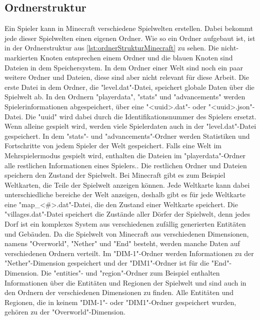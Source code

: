 \subsection{Ordnerstruktur} \label{ssec:ordnerstruktur}
Ein Spieler kann in Minecraft verschiedene Spielwelten erstellen. Dabei bekommt jede dieser Spielwelten einen eigenen Ordner. Wie so ein Ordner aufgebaut ist, ist in der Ordnerstruktur aus \ref{lst:ordnerStrukturMinecraft} zu sehen. Die nicht-markierten Knoten entsprechen einem Ordner und die blauen Knoten sind Dateien in dem Speichersystem. In dem Ordner einer Welt sind noch ein paar weitere Ordner und Dateien, diese sind aber nicht relevant für diese Arbeit. Die erste Datei in dem Ordner, die "level.dat"-Datei, speichert globale Daten über die Spielwelt ab. In den Ordnern "playerdata", "stats" und "advancements" werden Spielerinformationen abgespeichert, über eine "<uuid>.dat"- oder "<uuid>.json"-Datei. Die "uuid" wird dabei durch die Identifikationsnummer des Spielers ersetzt. Wenn alleine gespielt wird, werden viele Spielerdaten auch in der "level.dat"-Datei gespeichert. In dem "stats"- und "advancements"-Ordner werden Statistiken und Fortschritte von jedem Spieler der Welt gespeichert. Falls eine Welt im Mehrspielermodus gespielt wird, enthalten die Dateien im "playerdata"-Ordner alle restlichen Informationen eines Spielers.\cite{minecraftPlayerdatFormat}. Die restlichen Ordner und Dateien speichern den Zustand der Spielwelt. Bei Minecraft gibt es zum Beispiel Weltkarten, die Teile der Spielwelt anzeigen können. Jede Weltkarte kann dabei unterschiedliche bereiche der Welt anzeigen, deshalb gibt es für jede Weltkarte eine "map\_<\#>.dat"-Datei, die den Zustand einer Weltkarte speichert. Die "villages.dat"-Datei speichert die Zustände aller Dörfer der Spielwelt, denn jedes Dorf ist ein komplexes System aus verschiedenen zufällig generierten Entitäten und Gebäuden. Da die Spielwelt von Minecraft aus verschiedenen Dimensionen, namens "Overworld", "Nether" und "End" besteht, werden manche Daten auf verschiedenen Ordnern verteilt. Im "DIM-1"-Ordner werden Informationen zu der "Nether"-Dimension gespeichert und der "DIM1"-Ordner ist für die "End"-Dimension. Die "entities"- und "region"-Ordner zum Beispiel enthalten Informationen über die Entitäten und Regionen der Spielwelt und sind auch in den Ordnern der verschiedenen Dimensionen zu finden. Alle Entitäten und Regionen, die in keinem "DIM-1"- oder "DIM1"-Ordner gespeichert wurden, gehören zu der "Overworld"-Dimension.\cite{minecraftFolderStruc}

